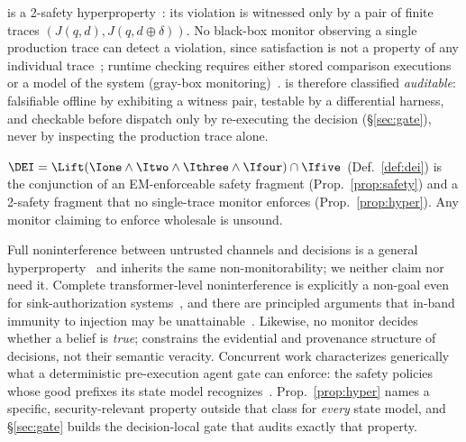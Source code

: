 \begin{proposition}
\label{prop:hyper}
\Ifive{} is a 2-safety hyperproperty~\cite{hyperprops}: its
violation is witnessed only by a pair of finite traces
$(J(q, d), J(q, d \oplus \delta))$. No black-box monitor observing
a single production trace can detect a violation, since
satisfaction is not a property of any individual
trace~\cite{hyperprops}; runtime checking requires either stored
comparison executions or a model of the system (gray-box
monitoring)~\cite{finkbeiner,stucki}. \Ifive{} is therefore
classified \emph{auditable}: falsifiable offline by exhibiting a
witness pair, testable by a differential harness, and checkable before
dispatch only by re-executing the decision (\S\ref{sec:gate}), never by
inspecting the production trace alone.
\end{proposition}

\begin{corollary}
\label{cor:decomp}
$\DEI = \Lift(\Ione \wedge \Itwo \wedge \Ithree \wedge \Ifour) \cap \Ifive$
(Def.~\ref{def:dei}) is the conjunction of an EM-enforceable
safety fragment (Prop.~\ref{prop:safety}) and a 2-safety fragment
that no single-trace monitor enforces (Prop.~\ref{prop:hyper}).
Any monitor claiming to enforce \DEI{} wholesale is unsound.
\end{corollary}

\begin{remark}
Full noninterference between untrusted channels and decisions is a
general hyperproperty~\cite{hyperprops,goguen} and inherits the same
non-monitorability; we neither claim nor need it. Complete
transformer-level noninterference is explicitly a non-goal even for
sink-authorization systems~\cite{cxi}, and there are principled
arguments that in-band immunity to injection may be
unattainable~\cite{abdelnabi}. Likewise, no monitor decides whether a
belief is \emph{true}; \DEI{} constrains the evidential and provenance
structure of decisions, not their semantic veracity. Concurrent work
characterizes generically what a deterministic pre-execution agent gate
can enforce: the safety policies whose good prefixes its state model
recognizes~\cite{ray2026enforced}. Prop.~\ref{prop:hyper} names a
specific, security-relevant property outside that class for
\emph{every} state model, and \S\ref{sec:gate} builds the
decision-local gate that audits exactly that property.
\end{remark}

